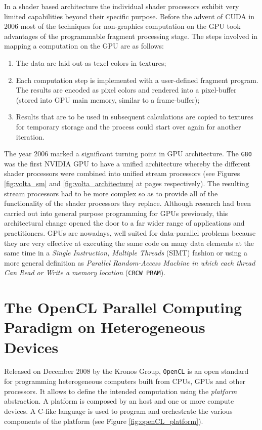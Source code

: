 \begin{description}
    In a shader based architecture the individual shader processors exhibit very limited capabilities beyond their specific purpose.
    Before the advent of CUDA in 2006 most of the techniques for non-graphics
    computation on the GPU took advantages of the programmable fragment processing stage. The steps involved in mapping a computation on the GPU are
    as follows:
    \begin{enumerate}
    	\item The data are laid out as texel colors in textures;
    	\item  Each computation step is implemented with a
    	user-defined fragment program. The results are encoded as pixel colors and rendered into a  pixel-buffer (stored into GPU main memory, similar to a frame-buffer); 
    	\item Results that are
    	to be used in subsequent calculations are copied to textures for temporary storage and the process could start over again for another iteration.
    \end{enumerate} 
    
    The year 2006 marked a significant turning point in GPU architecture. The \texttt{G80}  was the first \textsc{NVIDIA} GPU to have a unified architecture whereby the different shader processors were  combined into unified stream processors (see Figures \ref{fig:volta_sm} and \ref{fig:volta_architecture} at pages \pageref{fig:volta_sm}  \pageref{fig:volta_architecture} respectively). The resulting stream processors had to be more complex so as to provide all of the functionality of the shader processors they replace. Although research had been carried out into general purpose programming
    for GPUs previously, this architectural change opened the door to a far wider range of  applications and practitioners.
    GPUs are nowadays, well suited for data-parallel problems because they are very effective at executing the same code on many data elements at the same time  in a \textit{Single Instruction, Multiple Threads} (SIMT) fashion or using a more general definition as \textit{Parallel Random-Access Machine in which each thread Can Read or Write a memory location} (\texttt{CRCW PRAM}).
    
    
\section{The OpenCL Parallel Computing Paradigm on Heterogeneous Devices}
    Released on December 2008 by the Kronos Group, \texttt{OpenCL} \cite{Gaster:2011:HCO:2046379,Stone:2010:OPP:622179.1803953,Munshi:2011:OPG:2049883} is an open standard for programming heterogeneous computers built from CPUs, GPUs and other processors. It allows to define the intended computation using the \textit{platform} abstraction. A platform is composed by an host and one or more compute devices. A C-like language is used to program and orchestrate the various components of the platform (see Figure \ref{fig:openCL_platform}).
    

\end{description}
